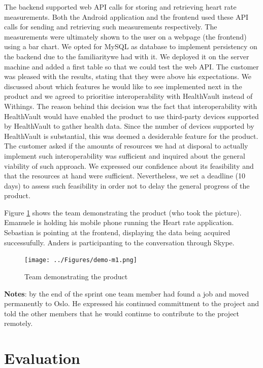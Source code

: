 The backend supported web API calls for storing and retrieving heart rate measurements.
Both the Android application and the frontend used these API calls for sending and retrieving
such measurements respectively.
The measurements were ultimately shown to the user on a webpage (the frontend) using a bar chart.
We opted for MySQL as database to implement persistency on the backend due to the familiaritywe had with it.
We deployed it on the server machine and added a first table so that we could test the web API.
The customer was pleased with the results, stating that they were above his expectations.
We discussed about which features he would like to see implemented next in the product
and we agreed to prioritise interoperability with HealthVault instead of Withings.
The reason behind this decision was the fact that interoperability with HealthVault would have
enabled the product to use third-party devices supported by HealthVault to gather health data.
Since the number of devices supported by HealthVault is substantial, this was deemed a
desiderable feature for the product.
The customer asked if the amounts of resources we had at disposal to actually implement
such interoperability was sufficient and inquired about the general viability of such approach.
We expressed our confidence about its feasibility and that the resources at hand were sufficient.
Nevertheless, we set a deadline (10 days) to assess such feasibility in order not to delay
the general progress of the product.

Figure \ref{figure:demonstration-m1} shows the team demonstrating the product (who took the picture).
Emanuele is holding his mobile phone running the Heart rate application.
Sebastian is pointing at the frontend, displaying the data being acquired successufully.
Anders is participanting to the conversation through Skype.

\begin{figure}[h]
\centering
\texttt{[image: ../Figures/demo-m1.png]}
\caption{Team demonstrating the product}
\label{figure:demonstration-m1}
\end{figure}

\textbf{Notes}: by the end of the sprint one team member had found a job and moved permanently to Oslo.
He expressed his continued committment to the project and told the other members that he would continue
to contribute to the project remotely.

\section{Evaluation}

